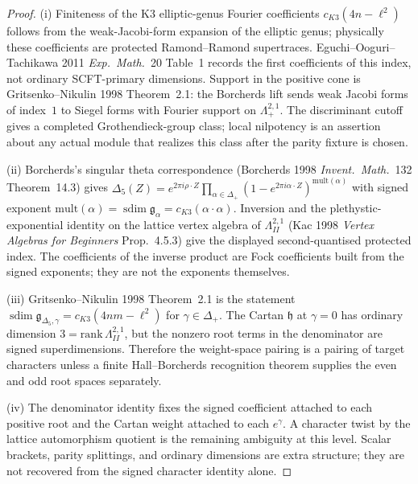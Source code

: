 \begin{proof}
(i) Finiteness of the K3 elliptic-genus Fourier coefficients
$c_{K3}(4n-\ell^2)$ follows from the weak-Jacobi-form expansion of
the elliptic genus; physically these coefficients are protected
Ramond--Ramond supertraces. Eguchi--Ooguri--Tachikawa 2011
\emph{Exp.\ Math.}~20 Table~1 records the first coefficients of this
index, not ordinary SCFT-primary dimensions. Support in the positive
cone is Gritsenko--Nikulin 1998 Theorem~2.1: the Borcherds lift sends
weak Jacobi forms of index~$1$ to Siegel forms with Fourier support
on $\Lambda_+^{2,1}$. The discriminant cutoff gives a completed
Grothendieck-group class; local nilpotency is an assertion about any
actual module that realizes this class after the parity fixture is
chosen.

(ii) Borcherds's singular theta correspondence
(Borcherds 1998 \emph{Invent.\ Math.}~132 Theorem~14.3) gives
$\Delta_5(Z) = e^{2\pi i\rho\cdot Z}
\prod_{\alpha\in\Delta_+}(1 - e^{2\pi i\alpha\cdot Z})^{\mathrm{mult}(\alpha)}$
with signed exponent
$\mathrm{mult}(\alpha)=\operatorname{sdim}\mathfrak g_\alpha
=c_{K3}(\alpha\cdot\alpha)$. Inversion and the
plethystic-exponential identity on the lattice vertex algebra of
$\Lambda^{2,1}_{II}$ (Kac 1998
\emph{Vertex Algebras for Beginners} Prop.~4.5.3) give the displayed
second-quantised protected index. The coefficients of the inverse
product are Fock coefficients built from the signed exponents; they
are not the exponents themselves.

(iii) Gritsenko--Nikulin 1998 Theorem~2.1 is the statement
$\operatorname{sdim}\mathfrak g_{\Delta_5,\gamma}
=c_{K3}(4nm-\ell^2)$ for $\gamma\in\Delta_+$. The Cartan
$\mathfrak h$ at $\gamma=0$ has ordinary dimension
$3=\mathrm{rank}\,\Lambda^{2,1}_{II}$, but the nonzero root terms in
the denominator are signed superdimensions. Therefore the
weight-space pairing is a pairing of target characters unless a
finite Hall--Borcherds recognition theorem supplies the even and odd
root spaces separately.

(iv) The denominator identity fixes the signed coefficient attached
to each positive root and the Cartan weight attached to each
$e^\gamma$. A character twist by the lattice automorphism quotient is
the remaining ambiguity at this level. Scalar brackets, parity
splittings, and ordinary dimensions are extra structure; they are
not recovered from the signed character identity alone.
\end{proof}

